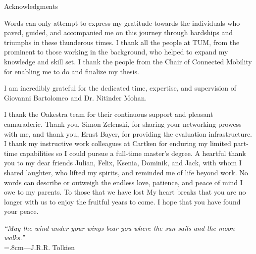 \thispagestyle{empty}

\vspace*{20mm}

\begin{center}
    { Acknowledgments}
\end{center}

\vspace{10mm}


Words can only attempt to express my gratitude towards the individuals who paved, guided, and accompanied me on this journey through hardships and triumphs in these thunderous times.
\vspace{5mm}\newline
I thank all the people at TUM, from the prominent to those working in the background, who helped to expand my knowledge and skill set.
I thank the people from the Chair of Connected Mobility for enabling me to do and finalize my thesis.

I am incredibly grateful for the dedicated time, expertise, and supervision of Giovanni Bartolomeo and Dr. Nitinder Mohan.

I thank the Oakestra team for their continuous support and pleasant camaraderie.
Thank you, Simon Zelenski, for sharing your networking prowess with me, and thank you, Ernst Bayer, for providing the evaluation infrastructure.
\vspace{5mm}\newline
I thank my instructive work colleagues at Cartken for enduring my limited part-time capabilities so I could pursue a full-time master's degree.
\vspace{5mm}\newline
A heartful thank you to my dear friends Julian, Felix, Ksenia, Dominik, and Jack, with whom I shared laughter, who lifted my spirits, and reminded me of life beyond work.
\vspace{5mm}\newline
No words can describe or outweigh the endless love, patience, and peace of mind I owe to my parents.
\vspace{5mm}\newline
To those that we have lost \newline
My heart breaks that you are no longer with us to enjoy the fruitful years to come. \newline
I hope that you have found your peace.

\vspace{10mm}
\begin{flushright}
    \centering
    \rightskip=1.8cm\textit{``May the wind under your wings bear you where the sun sails and the moon walks.''} \\
    \vspace{.2em}
    \rightskip=.8cm---J.R.R. Tolkien
\end{flushright}
\vspace{1em}

\cleardoublepage{}
